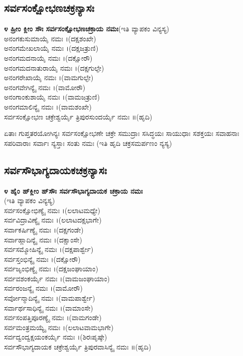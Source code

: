 \subsection{ಸರ್ವಸಂಕ್ಷೋಭಣಚಕ್ರನ್ಯಾಸಃ}
{\bfseries ೪ ಹ್ರೀಂ ಕ್ಲೀಂ ಸೌಃ ಸರ್ವಸಂಕ್ಷೋಭಣಚಕ್ರಾಯ ನಮಃ}(ಇತಿ ವ್ಯಾಪಕಂ ವಿನ್ಯಸ್ಯ)\\
 ಅನಂಗಕುಸುಮಾಯೈ ನಮಃ ।(ದಕ್ಷಶಂಖೇ)\\
 ಅನಂಗಮೇಖಲಾಯೈ ನಮಃ ।(ದಕ್ಷಜತ್ರುಣಿ)\\
 ಅನಂಗಮದನಾಯೈ ನಮಃ ।(ದಕ್ಷೋರೌ)\\
 ಅನಂಗಮದನಾತುರಾಯೈ ನಮಃ ।(ದಕ್ಷಗುಲ್ಫೇ)\\
 ಅನಂಗರೇಖಾಯೈ ನಮಃ ।(ವಾಮಗುಲ್ಫೇ)\\
 ಅನಂಗವೇಗಿನ್ಯೈ ನಮಃ ।(ವಾಮೋರೌ)\\
 ಅನಂಗಾಂಕುಶಾಯೈ ನಮಃ ।(ವಾಮಜತ್ರುಣಿ)\\
 ಅನಂಗಮಾಲಿನ್ಯೈ ನಮಃ ।(ವಾಮಶಂಖೇ)\\
 ಸರ್ವಸಂಕ್ಷೋಭಣ ಚಕ್ರೇಶ್ವರ್ಯೈ ತ್ರಿಪುರಸುಂದರ್ಯೈ ನಮಃ ॥(ಹೃದಿ)

 ಏತಾಃ ಗುಪ್ತತರಯೋಗಿನ್ಯಃ ಸರ್ವಸಂಕ್ಷೋಭಣೇ ಚಕ್ರೇ ಸಮುದ್ರಾಃ ಸಸಿದ್ಧಯಃ ಸಾಯುಧಾಃ ಸಶಕ್ತಯಃ ಸವಾಹನಾಃ ಸಪರಿವಾರಾಃ ಸರ್ವಾಃ ನ್ಯಸ್ತಾಃ ಸಂತು ನಮಃ (ಇತಿ ಹೃದಿ ಚಕ್ರಸಮರ್ಪಣಂ ನ್ಯಸ್ಯ)
\subsection{ಸರ್ವಸೌಭಾಗ್ಯದಾಯಕಚಕ್ರನ್ಯಾಸಃ}
{\bfseries ೪ ಹೈಂ ಹ್‌ಕ್ಲೀಂ ಹ್‌ಸೌಃ ಸರ್ವಸೌಭಾಗ್ಯದಾಯಕ ಚಕ್ರಾಯ ನಮಃ}\\(ಇತಿ ವ್ಯಾಪಕಂ ವಿನ್ಯಸ್ಯ)\\
 ಸರ್ವಸಂಕ್ಷೋಭಿಣ್ಯೈ ನಮಃ ।(ಲಲಾಟಮಧ್ಯೇ)\\
 ಸರ್ವವಿದ್ರಾವಿಣ್ಯೈ ನಮಃ ।(ಲಲಾಟದಕ್ಷಭಾಗೇ)\\
 ಸರ್ವಾಕರ್ಷಿಣ್ಯೈ ನಮಃ ।(ದಕ್ಷಗಂಡೇ)\\
 ಸರ್ವಾಹ್ಲಾದಿನ್ಯೈ ನಮಃ ।(ದಕ್ಷಾಂಸೇ)\\
 ಸರ್ವಸಮ್ಮೋಹಿನ್ಯೈ ನಮಃ ।(ದಕ್ಷಪಾರ್ಶ್ವೇ)\\
 ಸರ್ವಸ್ತಂಭಿನ್ಯೈ ನಮಃ ।(ದಕ್ಷೋರೌ)\\
 ಸರ್ವಜೃಂಭಿಣ್ಯೈ ನಮಃ ।(ದಕ್ಷಜಂಘಾಯಾಂ)\\
 ಸರ್ವವಶಂಕರ್ಯೈ ನಮಃ ।(ವಾಮಜಂಘಾಯಾಂ)\\
 ಸರ್ವರಂಜನ್ಯೈ ನಮಃ ।(ವಾಮೋರೌ)\\
 ಸರ್ವೋನ್ಮಾದಿನ್ಯೈ ನಮಃ ।(ವಾಮಪಾರ್ಶ್ವೇ)\\
 ಸರ್ವಾರ್ಥಸಾಧಿನ್ಯೈ ನಮಃ ।(ವಾಮಾಂಸೇ)\\
 ಸರ್ವಸಂಪತ್ತಿಪೂರಣ್ಯೈ ನಮಃ ।(ವಾಮಗಂಡೇ)\\
 ಸರ್ವಮಂತ್ರಮಯ್ಯೈ ನಮಃ ।(ಲಲಾಟವಾಮಭಾಗೇ)\\
 ಸರ್ವದ್ವಂದ್ವಕ್ಷಯಂಕರ್ಯೈ ನಮಃ ।(ಶಿರಃಪೃಷ್ಠೇ)\\
ಸರ್ವಸೌಭಾಗ್ಯದಾಯಕ ಚಕ್ರೇಶ್ವರ್ಯೈ ತ್ರಿಪುರವಾಸಿನ್ಯೈ ನಮಃ ॥(ಹೃದಿ)

